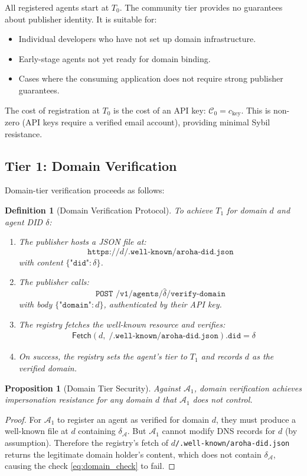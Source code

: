 \documentclass[conference]{IEEEtran}
\newtheorem{proposition}[theorem]{Proposition}
\newtheorem{definition}{Definition}
\newcommand{\Adv}{\mathcal{A}}
\newcommand{\Fetch}{\mathsf{Fetch}}
\begin{document}
All registered agents start at $T_0$.  The community tier
provides no guarantees about publisher identity.  It is
suitable for:
\begin{itemize}
  \item Individual developers who have not set up domain
    infrastructure.
  \item Early-stage agents not yet ready for domain binding.
  \item Cases where the consuming application does not
    require strong publisher guarantees.
\end{itemize}

The cost of registration at $T_0$ is the cost of an API key:
$\mathcal{C}_0 = c_{\text{key}}$. This is non-zero (API keys
require a verified email account), providing minimal Sybil
resistance.

\subsection{Tier 1: Domain Verification}

Domain-tier verification proceeds as follows:

\begin{definition}[Domain Verification Protocol]
\label{def:domain_verify}
To achieve $T_1$ for domain $d$ and agent DID $\delta$:
\begin{enumerate}
  \item The publisher hosts a JSON file at:
    \[
      \texttt{https://}d\texttt{/.well-known/aroha-did.json}
    \]
    with content $\{\texttt{"did"}: \delta\}$.
  \item The publisher calls:
    \[
      \texttt{POST /v1/agents/}\hat{\delta}
        \texttt{/verify-domain}
    \]
    with body $\{\texttt{"domain"}: d\}$, authenticated
    by their API key.
  \item The registry fetches the well-known resource and
    verifies:
    {\small\begin{align}
      &\Fetch\!\left(d,\;\texttt{/.well-known/aroha-did.json}
        \right)\texttt{.did} = \delta
        \label{eq:domain_check}
    \end{align}}
  \item On success, the registry sets the agent's tier to
    $T_1$ and records $d$ as the verified domain.
\end{enumerate}
\end{definition}

\begin{proposition}[Domain Tier Security]
\label{prop:domain}
Against $\Adv_1$, domain verification achieves
impersonation resistance for any domain $d$ that $\Adv_1$
does not control.
\end{proposition}
\begin{proof}
For $\Adv_1$ to register an agent as verified for domain
$d$, they must produce a well-known file at $d$ containing
$\delta_{\Adv}$. But $\Adv_1$ cannot modify DNS records for
$d$ (by assumption). Therefore the registry's fetch of
$d$\texttt{/.well-known/aroha-did.json} returns the
legitimate domain holder's content, which does not contain
$\delta_{\Adv}$, causing the check \eqref{eq:domain_check}
to fail.
\end{proof}
\end{document}
